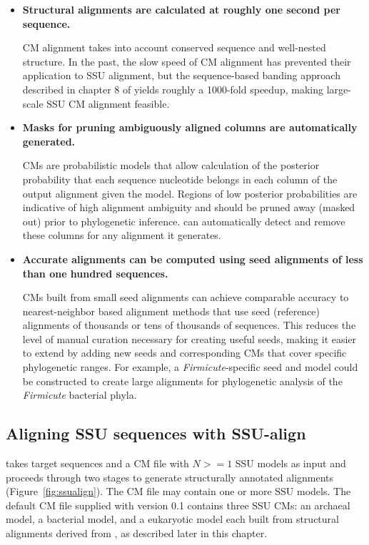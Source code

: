 \begin{itemize}

\item \textbf{Structural alignments are calculated at roughly one
  second per sequence.}  

  CM alignment takes into account conserved sequence and well-nested
  structure. In the past, the slow speed of CM alignment has prevented
  their application to SSU alignment, but the sequence-based banding
  approach described in chapter 8 of \cite{Nawrocki09b} yields roughly a 1000-fold speedup,
  making large-scale SSU CM alignment feasible.

\item \textbf{Masks for pruning ambiguously aligned columns are
  automatically generated.}
  
  CMs are probabilistic models that allow calculation of the posterior
  probability that each sequence nucleotide belongs in each column of the
  output alignment given the model. Regions of low posterior
  probabilities are indicative of high alignment ambiguity and
  should be pruned away (masked out) prior to phylogenetic
  inference.  can automatically detect and remove
  these columns for any alignment it generates.

\item \textbf{Accurate alignments can be computed using seed
  alignments of less than one hundred sequences.}

  CMs built from small seed alignments %
  can achieve comparable accuracy to nearest-neighbor based alignment
  methods that use seed (reference) alignments of thousands or tens of
  thousands of sequences. This reduces the level of manual curation
  necessary for creating useful seeds, making it easier to extend
   by adding new seeds and corresponding CMs that cover
  specific phylogenetic ranges. For example, a
  \emph{Firmicute}-specific seed and model could be constructed to
  create large alignments for phylogenetic analysis of the \emph{Firmicute}
  bacterial phyla.

\end{itemize}

\subsection{Aligning SSU sequences with SSU-align}

 takes target sequences and a CM file with $N >=
1$ SSU models as input and proceeds through two stages to generate
structurally annotated alignments (Figure~\ref{fig:ssualign}).  The CM
file
may contain one or more SSU models. The default CM file supplied with
 version 0.1 contains three SSU CMs: an archaeal model,
a bacterial model, and a eukaryotic model each
built from structural alignments derived from 
\cite{CannoneGutell02}, as described later in this chapter. 

